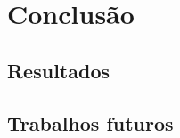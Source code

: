 \chapter[Conclusão]{Conclusão}


\section[Resultados]{Resultados}

\section[Trabalhos futuros]{Trabalhos futuros}
